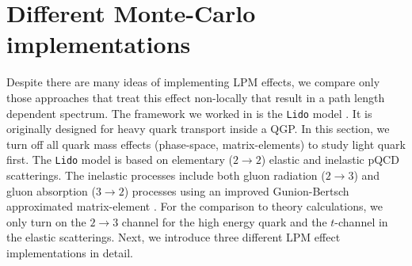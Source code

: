 \documentclass[aps, prc, reprint, amsmath, groupedaddress, nofootinbib]{revtex4-1}
\begin{document}
\section{Different Monte-Carlo implementations}\label{section:MC}
Despite there are many ideas of implementing LPM effects,
we compare only those approaches that treat this effect non-locally that result in a path length dependent spectrum.
The framework we worked in is the {\tt Lido} model \cite{Ke:2018tsh}. 
It is originally designed for heavy quark transport inside a QGP. 
In this section, we turn off all quark mass effects (phase-space, matrix-elements) to study light quark first.
The {\tt Lido} model is based on elementary ($2\rightarrow2$) elastic and inelastic pQCD scatterings. 
The inelastic processes include both gluon radiation ($2\rightarrow 3$) and gluon absorption ($3\rightarrow 2$) processes using an improved Gunion-Bertsch approximated matrix-element \cite{Fochler:2013epa,Uphoff:2014hza}.
For the comparison to theory calculations, we only turn on the $2\rightarrow 3$ channel for the high energy quark and the $t$-channel in the elastic scatterings.
Next, we introduce three different LPM effect implementations in detail.
\end{document}
